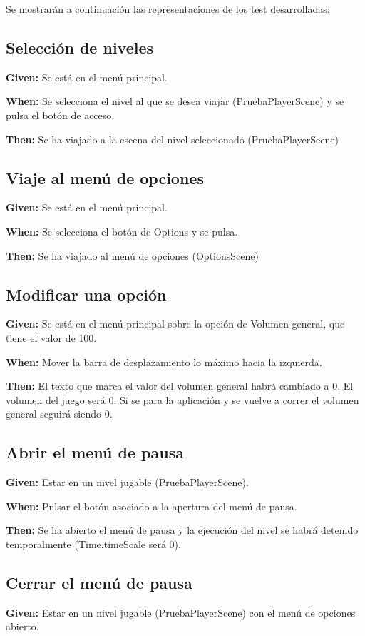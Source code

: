 Se mostrarán a continuación las representaciones de los test desarrolladas:

\subsection{Selección de niveles}
\textbf{Given:} Se está en el menú principal.

\textbf{When:} Se selecciona el nivel al que se desea viajar (PruebaPlayerScene) y se pulsa el botón de acceso.

\textbf{Then:} Se ha viajado a la escena del nivel seleccionado (PruebaPlayerScene)

\subsection{Viaje al menú de opciones}
\textbf{Given:} Se está en el menú principal.

\textbf{When:} Se selecciona el botón de Options y se pulsa.

\textbf{Then:} Se ha viajado al menú de opciones (OptionsScene)

\subsection{Modificar una opción}
\textbf{Given:} Se está en el menú principal sobre la opción de Volumen general, que tiene el valor de 100.

\textbf{When:} Mover la barra de desplazamiento lo máximo hacia la izquierda.

\textbf{Then:} El texto que marca el valor del volumen general habrá cambiado a 0. El volumen del juego será 0. Si se para la aplicación y se vuelve a correr el volumen general seguirá siendo 0.

\subsection{Abrir el menú de pausa}
\textbf{Given:} Estar en un nivel jugable (PruebaPlayerScene).

\textbf{When:} Pulsar el botón asociado a la apertura del menú de pausa.

\textbf{Then:} Se ha abierto el menú de pausa y la ejecución del nivel se habrá detenido temporalmente (Time.timeScale será 0).

\subsection{Cerrar el menú de pausa}
\textbf{Given:} Estar en un nivel jugable (PruebaPlayerScene) con el menú de opciones abierto.

